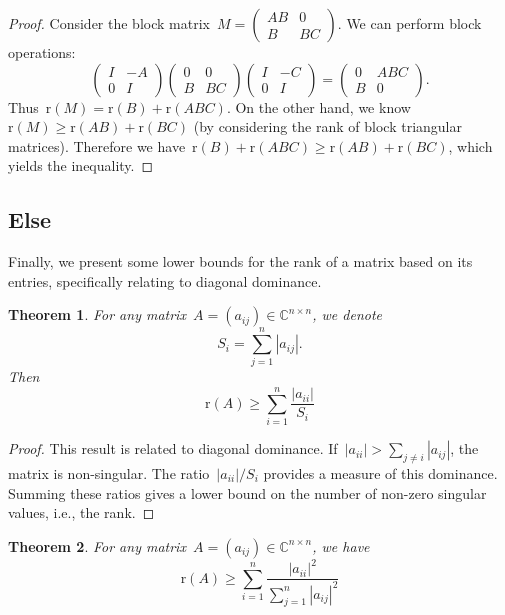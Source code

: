 \documentclass[12pt]{article}
\newtheorem{theorem}{Theorem}[section]
\newcommand{\rank}{\mathrm{r}}
\newcommand{\C}{\mathbb{C}}
\begin{document}
\begin{proof}
Consider the block matrix~$M = \begin{pmatrix} AB & 0 \\ B & BC \end{pmatrix}$.
We can perform block operations:
$$\begin{pmatrix} I & -A \\ 0 & I \end{pmatrix} \begin{pmatrix} 0 & 0 \\ B & BC \end{pmatrix} \begin{pmatrix} I & -C \\ 0 & I \end{pmatrix} = \begin{pmatrix} 0 & ABC \\ B & 0 \end{pmatrix}.$$
Thus~$\rank(M) = \rank(B) + \rank(ABC)$.
On the other hand, we know~$\rank(M) \ge \rank(AB) + \rank(BC)$ (by considering the rank of block triangular matrices).
Therefore we have~$\rank(B) + \rank(ABC) \ge \rank(AB) + \rank(BC)$, which yields the inequality.
\end{proof}

\subsection{Else}

Finally, we present some lower bounds for the rank of a matrix based on its entries, specifically relating to diagonal dominance.

\begin{theorem}
For any matrix~$A = (a_{ij}) \in \C^{n \times n}$, we denote
\[
S_i = \sum_{j=1}^n |a_{ij}|.
\]
Then
\[
\rank(A) \ge \sum_{i=1}^n \frac{|a_{ii}|}{S_i}
\]
\end{theorem}

\begin{proof}
This result is related to diagonal dominance. If~$|a_{ii}| > \sum_{j \ne i} |a_{ij}|$, the matrix is non-singular. The ratio~$|a_{ii}|/S_i$ provides a measure of this dominance. Summing these ratios gives a lower bound on the number of non-zero singular values, i.e., the rank.
\end{proof}

\begin{theorem}
For any matrix~$A = (a_{ij}) \in \C^{n \times n}$, we have
\[
\rank(A) \ge \sum_{i=1}^n \frac{|a_{ii}|^2}{\sum_{j=1}^n |a_{ij}|^2}
\]
\end{theorem}
\end{document}
